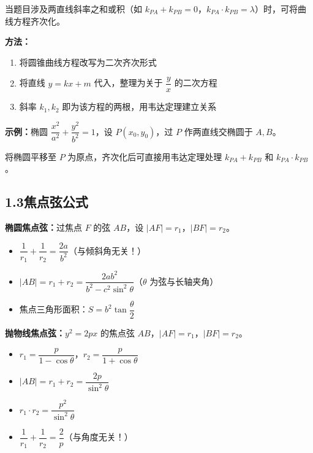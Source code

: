 \documentclass[12pt, a4paper]{ctexart}
\begin{document}
\begin{knowledgebox}
当题目涉及两直线斜率之和或积（如 $k_{PA}+k_{PB}=0$，$k_{PA}\cdot k_{PB}=\lambda$）时，可将曲线方程齐次化。

\textbf{方法：}
\begin{enumerate}[leftmargin=2em]
  \item 将圆锥曲线方程改写为二次齐次形式
  \item 将直线 $y=kx+m$ 代入，整理为关于 $\dfrac{y}{x}$ 的二次方程
  \item 斜率 $k_1,k_2$ 即为该方程的两根，用韦达定理建立关系
\end{enumerate}

\textbf{示例：}椭圆 $\dfrac{x^2}{a^2}+\dfrac{y^2}{b^2}=1$，设 $P(x_0,y_0)$，过 $P$ 作两直线交椭圆于 $A,B$。

将椭圆平移至 $P$ 为原点，齐次化后可直接用韦达定理处理 $k_{PA}+k_{PB}$ 和 $k_{PA}\cdot k_{PB}$。
\end{knowledgebox}

\subsection*{1.3\quad 焦点弦公式}

\begin{knowledgebox}[焦点弦的性质]
\textbf{椭圆焦点弦：}过焦点 $F$ 的弦 $AB$，设 $|AF|=r_1$，$|BF|=r_2$。

\begin{itemize}[leftmargin=2em]
  \item $\dfrac{1}{r_1}+\dfrac{1}{r_2}=\dfrac{2a}{b^2}$（与倾斜角无关！）
  \item $|AB|=r_1+r_2=\dfrac{2ab^2}{b^2-c^2\sin^2\theta}$（$\theta$ 为弦与长轴夹角）
  \item 焦点三角形面积：$S=b^2\tan\dfrac{\theta}{2}$
\end{itemize}

\textbf{抛物线焦点弦：}$y^2=2px$ 的焦点弦 $AB$，$|AF|=r_1$，$|BF|=r_2$。
\begin{itemize}[leftmargin=2em]
  \item $r_1=\dfrac{p}{1-\cos\theta}$，$r_2=\dfrac{p}{1+\cos\theta}$
  \item $|AB|=r_1+r_2=\dfrac{2p}{\sin^2\theta}$
  \item $r_1\cdot r_2=\dfrac{p^2}{\sin^2\theta}$
  \item $\dfrac{1}{r_1}+\dfrac{1}{r_2}=\dfrac{2}{p}$（与角度无关！）
\end{itemize}
\end{knowledgebox}
\end{document}

